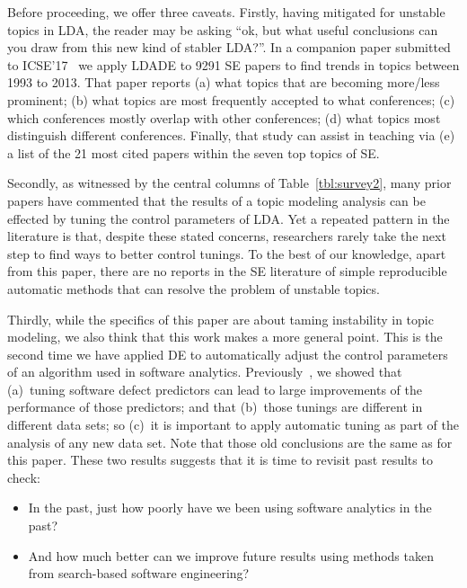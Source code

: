 \documentclass[10pt,conference]{IEEEtran}
\newcommand{\bi}{\begin{itemize}}
\newcommand{\ei}{\end{itemize}}
\theoremstyle{break}
\begin{document}
Before proceeding, we offer three caveats.
Firstly, having mitigated for unstable topics in LDA, the reader may be asking ``ok, but what useful
conclusions can you
draw from this new kind of stabler LDA?''. In a companion paper submitted to ICSE'17~\cite{mathews17}
we apply LDADE to 9291 SE papers to find trends in topics between
  1993 to 2013.
That paper reports (a) what topics that are
 becoming more/less prominent; (b) what topics  are most frequently
 accepted to what conferences; (c) which conferences mostly
 overlap with other conferences; (d) what topics most distinguish different
 conferences.  Finally, that study can assist
 in teaching via (e) a list of the 21 most cited papers within the seven top
 topics of SE.
 
Secondly, as
witnessed by the central columns of Table~\ref{tbl:survey2},
many prior papers have
commented that the results of a topic modeling analysis can be effected by
tuning the control parameters of LDA.  Yet a repeated pattern in the literature
is that, despite these stated concerns,
researchers rarely take the next step
to find ways to better control tunings.
To the best of our knowledge, apart from this paper, there are no reports in the SE literature
of simple reproducible automatic methods that can resolve the problem of unstable topics.




Thirdly, while the specifics of this paper are about taming instability in topic modeling,
we also think that this work makes a more general point.
      This is the second time we have applied DE to automatically
      adjust the control parameters of an algorithm
      used in software analytics. Previously~\cite{fu2016tuning},
      we showed  that (a)~tuning software defect predictors can lead to large improvements of the performance
      of those predictors; and that (b)~those tunings are different in different data sets; so (c)~it is important to apply
      automatic tuning as part of the analysis of any new data set. Note that those old conclusions are the same
      as for this paper. These two results suggests that it is time to revisit
      past results to check:
      \bi
    \item
       In the past, just
      how poorly have we been using software analytics
      in the past?
    \item
      And how much better can we improve future results using methods taken from search-based
      software engineering?
      \ei


\end{document}
